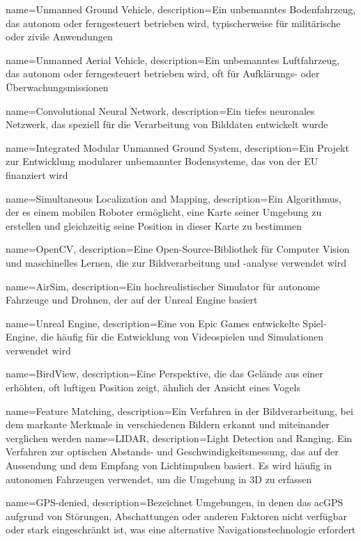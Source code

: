 {
    name=Unmanned Ground Vehicle,
    description={Ein unbemanntes Bodenfahrzeug, das autonom oder ferngesteuert betrieben wird, typischerweise für militärische oder zivile Anwendungen}
}

{
    name=Unmanned Aerial Vehicle,
    description={Ein unbemanntes Luftfahrzeug, das autonom oder ferngesteuert betrieben wird, oft für Aufklärungs- oder Überwachungsmissionen}
}

{
    name=Convolutional Neural Network,
    description={Ein tiefes neuronales Netzwerk, das speziell für die Verarbeitung von Bilddaten entwickelt wurde}
}

{
    name=Integrated Modular Unmanned Ground System,
    description={Ein Projekt zur Entwicklung modularer unbemannter Bodensysteme, das von der EU finanziert wird}
}

{
    name=Simultaneous Localization and Mapping,
    description={Ein Algorithmus, der es einem mobilen Roboter ermöglicht, eine Karte seiner Umgebung zu erstellen und gleichzeitig seine Position in dieser Karte zu bestimmen}
}

{
    name=OpenCV,
    description={Eine Open-Source-Bibliothek für Computer Vision und maschinelles Lernen, die zur Bildverarbeitung und -analyse verwendet wird}
}

{
    name=AirSim,
    description={Ein hochrealistischer Simulator für autonome Fahrzeuge und Drohnen, der auf der Unreal Engine basiert}
}

{
    name=Unreal Engine,
    description={Eine von Epic Games entwickelte Spiel-Engine, die häufig für die Entwicklung von Videospielen und Simulationen verwendet wird}
}

{
    name=BirdView,
    description={Eine Perspektive, die das Gelände aus einer erhöhten, oft luftigen Position zeigt, ähnlich der Ansicht eines Vogels}
}

{
    name=Feature Matching,
    description={Ein Verfahren in der Bildverarbeitung, bei dem markante Merkmale in verschiedenen Bildern erkannt und miteinander verglichen werden}
}
{
    name=LIDAR,
    description={Light Detection and Ranging. Ein Verfahren zur optischen Abstands- und Geschwindigkeitsmessung, das auf der Aussendung und dem Empfang von Lichtimpulsen basiert. Es wird häufig in autonomen Fahrzeugen verwendet, um die Umgebung in 3D zu erfassen}
}

{
    name=GPS-denied,
    description={Bezeichnet Umgebungen, in denen das ac{GPS} aufgrund von Störungen, Abschattungen oder anderen Faktoren nicht verfügbar oder stark eingeschränkt ist, was eine alternative Navigationstechnologie erfordert}
}

